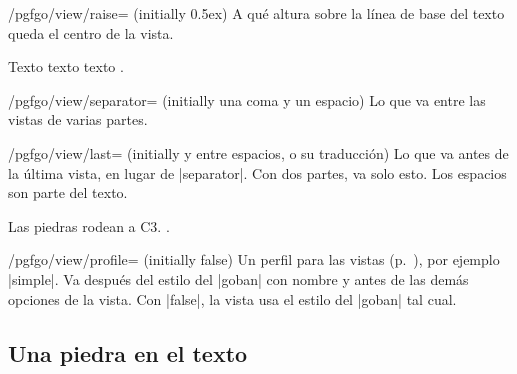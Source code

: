 	\begin{key}{/pgfgo/view/raise= (initially 0.5ex)}
		A qué altura sobre la línea de base del texto queda el centro de la vista.

		\begin{codeexample}[]
			Texto 
			texto 
			texto .
		\end{codeexample}
	\end{key}

	\begin{key}{/pgfgo/view/separator= (initially una coma y un espacio)}
		Lo que va entre las vistas de varias partes.
	\end{key}

	\begin{key}{/pgfgo/view/last= (initially y entre espacios, o su traducción)}
		Lo que va antes de la última vista, en lugar de |separator|. Con dos partes, va solo esto. Los espacios son parte del texto.

		\begin{codeexample}[]
			Las piedras  rodean a C3.
			.
		\end{codeexample}
	\end{key}

	\begin{key}{/pgfgo/view/profile= (initially false)}
		Un perfil para las vistas (p.~\pageref{subsec:perfiles}), por ejemplo |simple|. Va después del estilo del |goban| con nombre y antes de las demás opciones de la vista. Con |false|, la vista usa el estilo del |goban| tal cual.

		\begin{codeexample}[]
		\end{codeexample}
	\end{key}

	\subsection{Una piedra en el texto}
	\label{subsec:piedra-texto}

